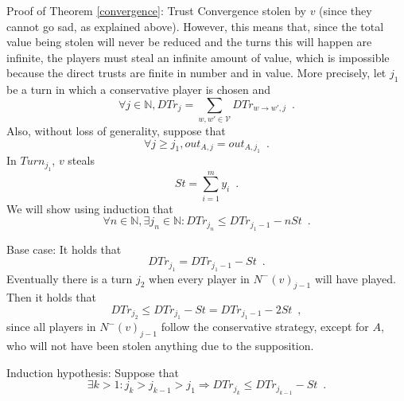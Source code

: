 \begin{sepproof}{Proof of Theorem \ref{convergence}: Trust Convergence}
  stolen by $v$ (since they cannot go sad, as explained above). However, this means that, since the total value being
  stolen will never be reduced and the turns this will happen are infinite, the players must steal an infinite amount of
  value, which is impossible because the direct trusts are finite in number and in value. More precisely, let $j_1$ be
  a turn in which a conservative player is chosen and
  \begin{equation*}
    \forall j \in \mathbb{N}, DTr_j = \sum\limits_{w,w' \in \mathcal{V}}DTr_{w \rightarrow w', j} \enspace.
  \end{equation*}
  Also, without loss of generality, suppose that
  \begin{equation*}
    \forall j \geq j_1, out_{A, j} = out_{A, j_1} \enspace.
  \end{equation*}
  In $Turn_{j_1}$, $v$ steals
  \begin{equation*}
    St = \sum\limits_{i=1}^{m}y_i \enspace.
  \end{equation*}
  We will show using induction that
  \begin{equation*}
    \forall n \in \mathbb{N}, \exists j_n \in \mathbb{N} : DTr_{j_n} \leq DTr_{j_1-1} - nSt \enspace.
  \end{equation*}

  Base case: It holds that
  \begin{equation*}
    DTr_{j_1} = DTr_{j_1-1} - St \enspace.
  \end{equation*}
  Eventually there is a turn $j_2$ when every player in $N^{-}(v)_{j-1}$ will have played. Then it holds that
  \begin{equation*}
    DTr_{j_2} \leq DTr_{j_1} - St = DTr_{j_1-1} - 2St \enspace,
  \end{equation*}
  since all players in $N^{-}(v)_{j-1}$ follow the conservative strategy, except for $A$, who will not have been stolen
  anything due to the supposition.

  Induction hypothesis: Suppose that
  \begin{equation*}
    \exists k > 1 : j_k > j_{k-1} > j_1 \Rightarrow DTr_{j_k} \leq DTr_{j_{k-1}} - St \enspace.
  \end{equation*}


\end{sepproof}
